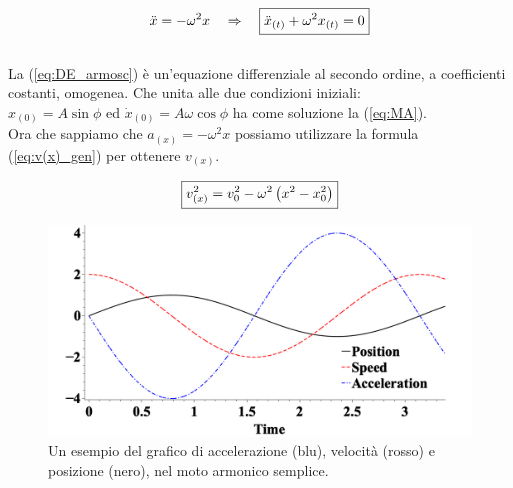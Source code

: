 \begin{equation}
    \ddot x = -\omega^2x\quad\Rightarrow\quad \boxed{\ddot x_{(t)} + \omega^2x_{(t)} = 0}
\label{eq:DE_armosc}
\end{equation}
\\
La (\ref{eq:DE_armosc}) è un'equazione differenziale al secondo ordine,
a coefficienti costanti, omogenea. Che unita alle due condizioni iniziali:\\
$x_{(0)} = A\sin\phi$ ed $\dot x_{(0)} = A\omega\cos\phi $ ha come soluzione
la (\ref{eq:MA}).\\
Ora che sappiamo che $a_{(x)} = -\omega^2x$ possiamo utilizzare la formula
(\ref{eq:v(x)_gen}) per ottenere $v_{(x)}$.

\begin{equation}
    \boxed{v^2_{(x)} = v_0^2 - \omega^2\left( x^2 - x_0^2\right)}
\label{eq:v(x)_MA}
\end{equation}

\begin{figure}[htbp]
    \begin{center}
        \includegraphics[width=13cm]{images/MA.png} 
        \caption{Un esempio del grafico di accelerazione (blu), velocità
        (rosso) e posizione (nero), nel moto armonico semplice.
        }
    \end{center}
\label{fig:MA}
\end{figure}